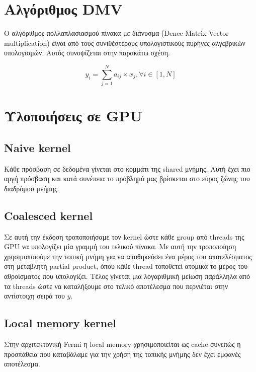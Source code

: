 







\setcounter{section}{1}

\section{Αλγόριθμος DMV}
Ο αλγόριθμος πολλαπλασιασμού πίνακα με διάνυσμα (Dence Matrix-Vector
multiplication) είναι από τους συνιθέστερους υπολογιστικούς πυρήνες αλγεβρικών
υπολογισμών. Αυτός συνοψίζεται στην παρακάτω σχέση.

\[
    y_i = \sum_{j=1}^{N}a_{ij}\times x_{j}, \forall i \in [1,N]
\]



\section{Υλοποιήσεις σε GPU}

\subsection{Naive kernel}
Κάθε πρόσβαση σε δεδομένα γίνεται στο κομμάτι της shared μνήμης. Αυτή έχει πιο
αργή πρόσβαση και κατά συνέπεια το πρόβλημά μας βρίσκεται στο εύρος ζώνης του
διαδρόμου μνήμης.

\subsection{Coalesced kernel}
Σε αυτή την έκδοση τροποποιήσαμε τον kernel ώστε κάθε group από threads της
GPU να υπολογίζει μία γραμμή του τελικού πίνακα. Με αυτή την τροποποίηση
χρησιμοποιούμε την τοπική μνήμη για να αποθηκεύσει ένα μέρος του αποτελέσματος
στη μεταβλητή partial product, όπου κάθε thread τοποθετεί ατομικά το μέρος του
αθροίσματος που υπολογίζει. Τέλος γίνεται μια λογαριθμική μείωση παράλληλα από
τα threads ώστε να καταλήξουμε στο τελικό αποτέλεσμα που περνιέται στην
αντίστοιχη σειρά του $y$.


\subsection{Local memory kernel}
Στην αρχιτεκτονική Fermi η local memory χρησιμοποιείται ως cache συνεπώς η
προσπάθεια που καταβάλαμε για την χρήση της τοπικής μνήμης δεν έχει εμφανές
αποτέλεσμα.






